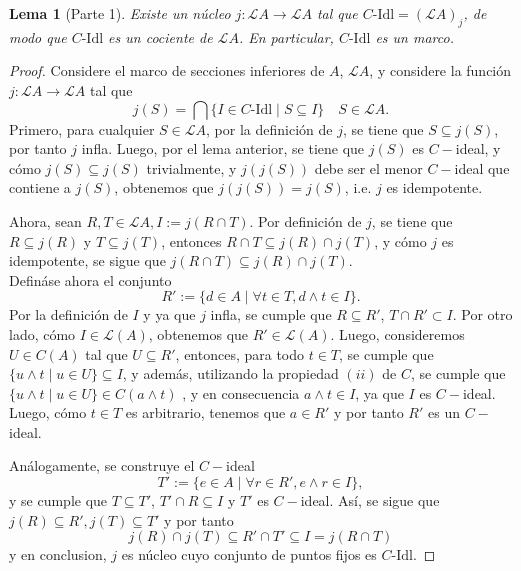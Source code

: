 \documentclass[12pt,letterpaper,titlepage]{article}
\newtheorem*{lemma}{Lema}
\theoremstyle{definition}
\renewcommand\cal[1]{\mathcal{#1}}
\newcommand\<{\langle}
\renewcommand\>{\rangle}
\newcommand\Idl{\text{-}\mathrm{Idl}}
\begin{document}
\begin{lemma}[Parte 1]
    Existe un núcleo $j:\cal LA\to\cal LA$ tal que
    $C\Idl=(\cal LA)_j$, de modo que $C\Idl$ es un cociente
    de $\cal LA$.
    En particular, $C\Idl$ es un marco.
\end{lemma}
\begin{proof}
    Considere el marco de secciones inferiores de $A$, $\mathcal{L}A$, y considere la función $j:\mathcal{L}A\to\mathcal{L}A$ tal que
    \begin{equation*}
        j(S)=\bigcap\{I\in C\Idl\mid S\subseteq I\}\quad S\in\mathcal{L}A.
    \end{equation*}
    Primero, para cualquier $S\in\mathcal{L}A$, por la definición de $j$, se tiene que $S\subseteq j(S)$, por tanto $j$ infla. Luego, por el lema anterior, se tiene que $j(S)$ es $C-$ideal, y cómo $j(S)\subseteq j(S)$ trivialmente, y $j(j(S))$ debe ser el menor $C-$ideal que contiene a $j(S)$, obtenemos que $j(j(S))=j(S)$, i.e. $j$ es idempotente.
    
    Ahora, sean $R,T\in\mathcal{L}A, I:=j(R\cap T)$. Por definición de $j$, se tiene que $R\subseteq j(R)$ y $T\subseteq j(T)$, entonces $R\cap T\subseteq j(R)\cap j(T)$, y cómo $j$ es idempotente, se sigue que $j(R\cap T)\subseteq j(R)\cap j(T)$.\\
    Defináse ahora el conjunto
    \begin{equation*}
        R' := \{d\in A\mid \forall t\in T,d\wedge t\in I\}.
    \end{equation*}
    Por la definición de $I$ y ya que $j$ infla, se cumple que $R\subseteq R'$, $T\cap R'\subset I$. Por otro lado, cómo $I\in\mathcal{L}(A)$, obtenemos que $R'\in\mathcal{L}(A)$. Luego, consideremos $U\in C(A)$ tal que $U\subseteq R'$, entonces, para todo $t\in T$, se cumple que $\{u\wedge t\mid u\in U\}\subseteq I$, y además, utilizando la propiedad $(ii)$ de $C$, se cumple que $\{u\wedge t\mid u\in U\}\in C(a\wedge t)$ , y en consecuencia $a\wedge t\in I$, ya que $I$ es $C-$ideal. Luego, cómo $t\in T$ es arbitrario, tenemos que $a\in R'$ y por tanto $R'$ es un $C-$ideal.
    
    Análogamente, se construye el $C-$ideal
    \begin{equation*}
         T' := \{e\in A\mid \forall r\in R',e\wedge r\in I\},
    \end{equation*}
    y se cumple que $T\subseteq T'$, $T'\cap R\subseteq I$ y $T'$ es $C-$ideal. Así, se sigue que $j(R)\subseteq R',j(T)\subseteq T'$ y por tanto
    \begin{equation*}
        j(R)\cap j(T)\subseteq R'\cap T' \subseteq  I = j(R\cap T)
    \end{equation*}
    y en conclusion, $j$ es núcleo cuyo conjunto de puntos fijos
    es $C\Idl$.
\end{proof}
\end{document}
